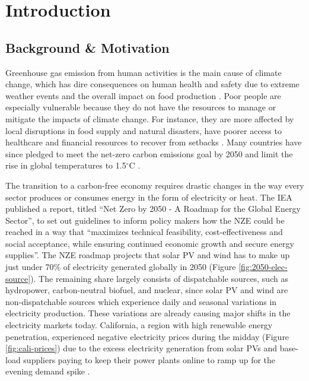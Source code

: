 \section{Introduction}

\subsection{Background \& Motivation}

Greenhouse gas emission from human activities is the main cause of climate
change, which has dire consequences on human health and safety due to extreme
weather events and the overall impact on food production
\cite{mcmichael_global_2004}. Poor people are especially vulnerable because
they do not have the resources to manage or mitigate the impacts of climate
change. For instance, they are more affected by local disruptions in food
supply and natural disasters, have poorer access to healthcare and financial
resources to recover from setbacks \cite{hallegatte_shock_2016}. Many countries
have since pledged to meet the net-zero carbon emissions goal by 2050 and limit
the rise in global temperatures to 1.5$^{\circ}$C \cite{iea_net_2021}.

The transition to a carbon-free economy requires drastic changes in the way
every sector produces or consumes energy in the form of electricity or heat.
The \gls{IEA} published a report, titled ``Net Zero by 2050 - A Roadmap for the
Global Energy Sector'', to set out guidelines to inform policy makers how the
\gls{NZE} could be reached in a way that ``maximizes technical feasibility,
cost-effectiveness and social acceptance, while ensuring continued economic
growth and secure energy supplies''. The \gls{NZE} roadmap projects that
solar \gls{PV} and wind has to make up just under 70\% of
electricity generated globally in 2050 (Figure \ref{fig:2050-elec-source}).
The remaining share largely consists of dispatchable sources, such as
hydropower, carbon-neutral biofuel, and nuclear, since solar \gls{PV} and wind
are non-dispatchable sources which experience daily and seasonal variations in
electricity production. These variations are already causing major shifts in
the electricity markets today. California, a region with high renewable energy
penetration, experienced negative electricity prices during the midday (Figure
\ref{fig:cali-prices}) due to the excess electricity generation from solar
\glspl{PV} and base-load suppliers paying to keep their power plants online to
ramp up for the evening demand spike \cite{forsberg_market_2020}.

